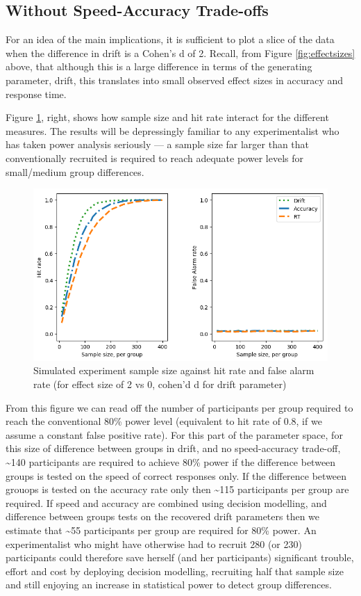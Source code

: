 \documentclass[floatsintext,doc]{apa6}
\theoremstyle{definition}
\theoremstyle{definition}
\theoremstyle{definition}
\theoremstyle{remark}
\begin{document}
\subsection{Without Speed-Accuracy
Trade-offs}\label{without-speed-accuracy-trade-offs}

For an idea of the main implications, it is sufficient to plot a slice
of the data when the difference in drift is a Cohen's d of 2. Recall,
from Figure \ref{fig:effectsizes} above, that although this is a large
difference in terms of the generating parameter, drift, this translates
into small observed effect sizes in accuracy and response time.

Figure \ref{fig:vanilla}, right, shows how sample size and hit rate
interact for the different measures. The results will be depressingly
familiar to any experimentalist who has taken power analysis seriously
--- a sample size far larger than that conventionally recruited is
required to reach adequate power levels for small/medium group
differences.

\begin{figure}

{\centering \includegraphics[width=0.68\linewidth]{figs/NOSATO_hit_and_FA} 

}

\caption{Simulated experiment sample size against hit rate and false alarm rate (for effect size of 2 vs 0, cohen'd d for drift parameter)}\label{fig:vanilla}
\end{figure}

From this figure we can read off the number of participants per group
required to reach the conventional 80\% power level (equivalent to hit
rate of 0.8, if we assume a constant false positive rate). For this part
of the parameter space, for this size of difference between groups in
drift, and no speed-accuracy trade-off, \textasciitilde{}140
participants are required to achieve 80\% power if the difference
between groups is tested on the speed of correct responses only. If the
difference between grouops is tested on the accuracy rate only then
\textasciitilde{}115 participants per group are required. If speed and
accuracy are combined using decision modelling, and difference between
groups tests on the recovered drift parameters then we estimate that
\textasciitilde{}55 participants per group are required for 80\% power.
An experimentalist who might have otherwise had to recruit 280 (or 230)
participants could therefore save herself (and her participants)
significant trouble, effort and cost by deploying decision modelling,
recruiting half that sample size and still enjoying an increase in
statistical power to detect group differences.
\end{document}

